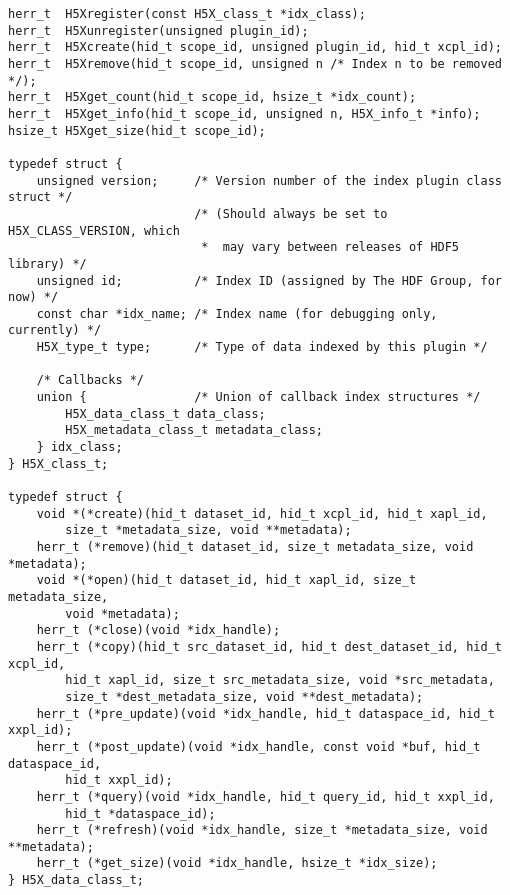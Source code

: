 {
\begin{lstlisting}
herr_t  H5Xregister(const H5X_class_t *idx_class);
herr_t  H5Xunregister(unsigned plugin_id);
herr_t  H5Xcreate(hid_t scope_id, unsigned plugin_id, hid_t xcpl_id);
herr_t  H5Xremove(hid_t scope_id, unsigned n /* Index n to be removed */);
herr_t  H5Xget_count(hid_t scope_id, hsize_t *idx_count);
herr_t  H5Xget_info(hid_t scope_id, unsigned n, H5X_info_t *info);
hsize_t H5Xget_size(hid_t scope_id);

typedef struct {
    unsigned version;     /* Version number of the index plugin class struct */
                          /* (Should always be set to H5X_CLASS_VERSION, which
                           *  may vary between releases of HDF5 library) */
    unsigned id;          /* Index ID (assigned by The HDF Group, for now) */
    const char *idx_name; /* Index name (for debugging only, currently) */
    H5X_type_t type;      /* Type of data indexed by this plugin */

    /* Callbacks */
    union {               /* Union of callback index structures */
        H5X_data_class_t data_class;
        H5X_metadata_class_t metadata_class;
    } idx_class;
} H5X_class_t;

typedef struct {
    void *(*create)(hid_t dataset_id, hid_t xcpl_id, hid_t xapl_id,
        size_t *metadata_size, void **metadata);
    herr_t (*remove)(hid_t dataset_id, size_t metadata_size, void *metadata);
    void *(*open)(hid_t dataset_id, hid_t xapl_id, size_t metadata_size,
        void *metadata);
    herr_t (*close)(void *idx_handle);
    herr_t (*copy)(hid_t src_dataset_id, hid_t dest_dataset_id, hid_t xcpl_id,
        hid_t xapl_id, size_t src_metadata_size, void *src_metadata,
        size_t *dest_metadata_size, void **dest_metadata);
    herr_t (*pre_update)(void *idx_handle, hid_t dataspace_id, hid_t xxpl_id);
    herr_t (*post_update)(void *idx_handle, const void *buf, hid_t dataspace_id,
        hid_t xxpl_id);
    herr_t (*query)(void *idx_handle, hid_t query_id, hid_t xxpl_id,
        hid_t *dataspace_id);
    herr_t (*refresh)(void *idx_handle, size_t *metadata_size, void **metadata);
    herr_t (*get_size)(void *idx_handle, hsize_t *idx_size);
} H5X_data_class_t;
\end{lstlisting}
}


